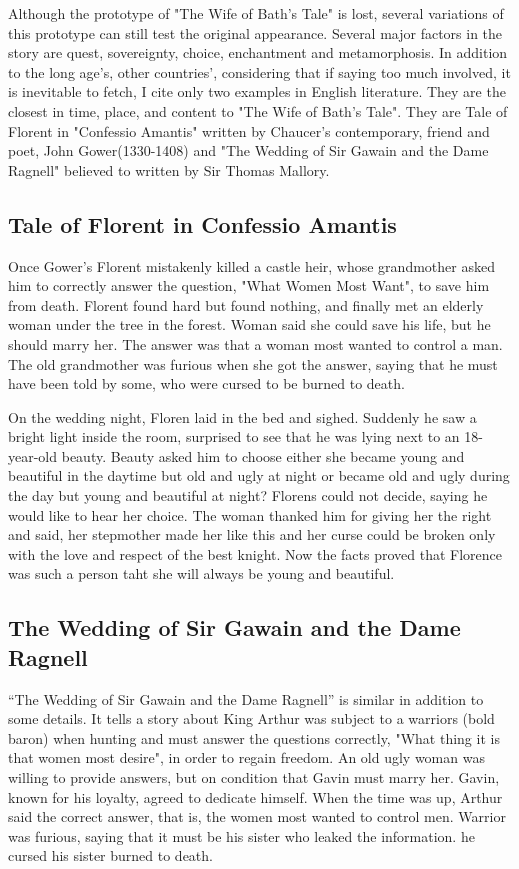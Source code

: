 Although the prototype of "The Wife of Bath's Tale" is lost, several variations of this prototype can still test the original appearance. Several major factors in the story are quest, sovereignty, choice, enchantment and metamorphosis. In addition to the long age's, other countries', considering that if saying too much involved, it is inevitable to fetch, I cite only two examples in English literature. They are the closest in time, place, and content to "The Wife of Bath's Tale". They are Tale of Florent in "Confessio Amantis"\cite{gower1980confessio} written by Chaucer's contemporary, friend and poet, John Gower(1330-1408)\cite{fisher1964john} and "The Wedding of Sir Gawain and the Dame Ragnell"\cite{wedding1924weddynge} believed to written by Sir Thomas Mallory.

\subsection{Tale of Florent in Confessio Amantis}
Once Gower's Florent mistakenly killed a castle heir, whose grandmother asked him to correctly answer the question, "What Women Most Want", to save him from death. Florent found hard but found nothing, and finally met an elderly woman under the tree in the forest. Woman said she could save his life, but he should marry her. The answer was that a woman most wanted to control a man. The old grandmother was furious when she got the answer, saying that he must have been told by some, who were cursed to be burned to death.

On the wedding night, Floren laid in the bed and sighed. Suddenly he saw a bright light inside the room, surprised to see that he was lying next to an 18-year-old beauty. Beauty asked him to choose either she became young and beautiful in the daytime but old and ugly at night or became old and ugly during the day but young and beautiful at night? Florens could not decide, saying he would like to hear her choice. The woman thanked him for giving her the right and said, her stepmother made her like this and her curse could be broken only with the love and respect of the best knight. Now the facts proved that Florence was such a person taht she will always be young and beautiful.

\subsection{The Wedding of Sir Gawain and the Dame Ragnell}
“The Wedding of Sir Gawain and the Dame Ragnell” is similar in addition to some details. It tells a story about King Arthur was subject to a warriors (bold baron) when hunting and must answer the questions correctly, "What thing it is that women most desire", in order to regain freedom. An old ugly woman was willing to provide answers, but on condition that Gavin must marry her. Gavin, known for his loyalty, agreed to dedicate himself. When the time was up, Arthur said the correct answer, that is, the women most wanted to control men. Warrior was furious, saying that it must be his sister who leaked the information. he cursed his sister burned to death.

